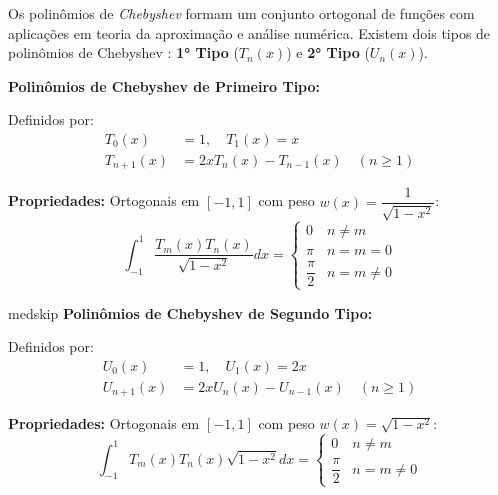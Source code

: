 \documentclass[a4paper, 12pt]{article}
\numberwithin{equation}{section}
\begin{document}

\begin{tcolorbox}[
    colback=gray!10!white, 
    colframe=green!40!black, 
    title={Polinômios de Chebyshev},
    boxrule=0.5pt,           %
    arc=3pt,                 %
    left=5pt, right=5pt,     %
    top=5pt, bottom=5pt,     %
    before skip=10pt,        %
    after skip=10pt,         %
    fontupper=\small,        %
    fonttitle=\small\bfseries %
]
Os polinômios de \textit{Chebyshev} formam um conjunto ortogonal de funções com aplicações 
em teoria da aproximação e análise numérica.  Existem dois tipos de polinômios de
Chebyshev : \textbf{1° Tipo} ($T_n(x)$) e \textbf{2° Tipo} ($U_n(x)$).


\medskip
\textbf{Polinômios de Chebyshev de Primeiro Tipo:}

Definidos por:
\begin{align*}
    T_0(x) &= 1, \quad T_1(x) = x \\
    T_{n+1}(x) &= 2xT_n(x) - T_{n-1}(x) \quad (n \geq 1)
\end{align*}

\smallskip
\textbf{Propriedades:} Ortogonais em $[-1,1]$ com peso $w(x) = \dfrac{1}{\sqrt{1 - x^2}}$:
\[
\int_{-1}^{1} \frac{T_m(x)T_n(x)}{\sqrt{1 - x^2}} dx = 
\begin{cases}
    0 & n \neq m \\ 
    \pi & n = m = 0 \\ 
    \dfrac{\pi}{2} & n = m \neq 0
\end{cases}
\]

medskip
\textbf{ Polinômios de Chebyshev de Segundo Tipo:}

Definidos por:
\begin{align*}
    U_0(x) &= 1, \quad U_1(x) = 2x \\
    U_{n+1}(x) &= 2xU_n(x) - U_{n-1}(x) \quad (n \geq 1)
\end{align*}

\smallskip
\textbf{Propriedades:} Ortogonais em $[-1,1]$ com peso $w(x) = \sqrt{1 - x^2}$:
\[
\int_{-1}^{1} T_m(x)T_n(x)\sqrt{1 - x^2} dx = 
\begin{cases}
    0 & n \neq m \\  
    \dfrac{\pi}{2} & n = m \neq 0
\end{cases}
\]


\end{tcolorbox}
\end{document}
